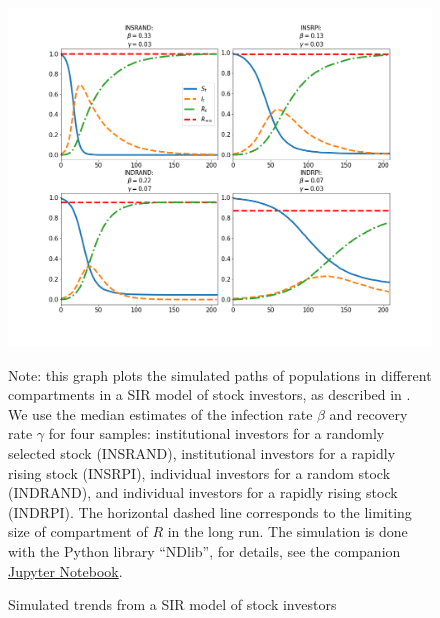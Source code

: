 \begin{figure}[!ht] \centering  %
	\caption{Simulated trends from a SIR model of stock investors}
	\label{fig:sir_simulate}
	\centerline{\includegraphics[width=\textwidth]{./figures/sir_simulate.png}}
	\begin{flushleft}
	{\footnotesize Note: this graph plots the simulated paths of populations in different compartments in a SIR model of stock investors, as described in \cite{shiller1989survey}. We use the median estimates of the infection rate $\beta$ and recovery rate $\gamma$ for four samples: institutional investors for a randomly selected stock (INSRAND), institutional investors for a rapidly rising stock (INSRPI), individual investors for a random stock (INDRAND), and individual investors for a rapidly rising stock (INDRPI). The horizontal dashed line corresponds to the limiting size of compartment of $R$ in the long run. The simulation is done with the Python library ``NDlib'', for details, see the companion \href{https://github.com/iworld1991/EpiExp/blob/master/Python/SIR_Ndlib.ipynb}{Jupyter Notebook}. }
				\end{flushleft}
\end{figure}
